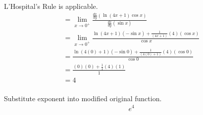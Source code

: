 \documentclass{article}
\begin{document}
\begin{description}
\begin{description}
                L'Hospital's Rule is applicable.
                \begin{align*}
                   & = \lim_{x\to0^+}\frac{\frac{dx}{dy}(\ln{(4x + 1)\cos{x}})}{\frac{dx}{dy}(\sin{x})}       \\[1em]
                   & = \lim_{x\to0^+}\frac{\ln{(4x + 1)}(-\sin{x}) + \frac{1}{(4x + 1)}(4)(\cos{x})}{\cos{x}} \\[1em]
                   & = \frac{\ln{(4(0) + 1)}(-\sin{0}) + \frac{1}{(4(0) + 1)}(4)(\cos{0})}{\cos{0}}           \\[1em]
                   & = \frac{(0)(0) + \frac{1}{1}(4)(1)}{1}                                                   \\[1em]
                   & = 4                                                                                      \\[1em]
                \end{align*}

                Substitute exponent into modified original function.
                \begin{align*}
                   & \boxed{e^{4}}
                \end{align*}
        \end{description}
\end{description}
\end{document}
